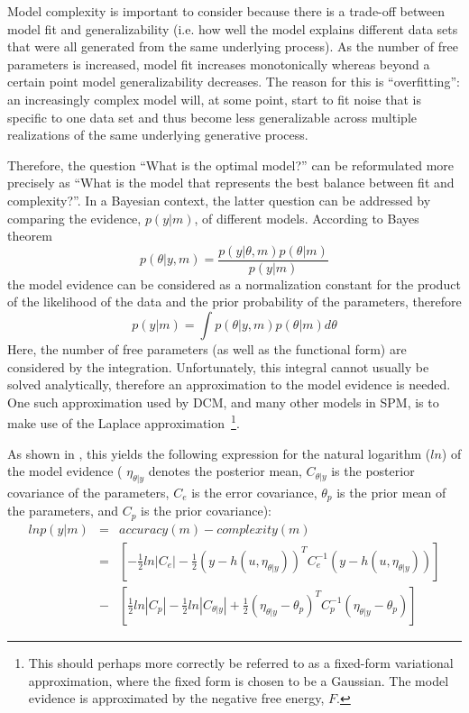Model complexity is important to consider because there is a trade-off between model fit and generalizability (i.e. how well the model explains different data sets that were all generated from the same underlying process).  As the number of free parameters is increased, model fit increases monotonically whereas beyond a certain point model generalizability decreases.  The reason for this is ``overfitting'':  an increasingly complex model will, at some point, start to fit noise that is specific to one data set and thus become less generalizable across multiple realizations of the same underlying generative process.

    Therefore, the question ``What is the optimal model?'' can be reformulated more precisely as ``What is the model that represents the best balance between fit and complexity?''. In a Bayesian context, the latter question can be addressed by comparing the evidence, $p(y|m)$, of different models. According to Bayes theorem
\begin{equation}
p(\theta|y,m) = \frac{p(y|\theta,m)p(\theta|m)}{p(y|m)}
\end{equation}
the model evidence can be considered as a normalization constant for the product of the likelihood of the data and the prior probability of the parameters, therefore
\begin{equation}
p(y|m) = \int p(\theta|y,m) p(\theta|m) d\theta
\end{equation}
Here, the number of free parameters (as well as the functional form) are considered by the integration.  Unfortunately, this integral cannot usually be solved analytically, therefore an approximation to the model evidence is needed. One such approximation used by DCM, and many other models in SPM, is to make use of the Laplace approximation~\footnote{This should perhaps more correctly be referred to as a fixed-form variational approximation, where the fixed form is chosen to be a Gaussian. The model evidence is approximated by the negative free energy, $F$.}.

As shown in \cite{cdcm}, this yields the following expression for the natural logarithm ($ln$) of the model evidence ( $\eta_{\theta | y}$ denotes the posterior mean, $C_{\theta | y}$ is the posterior covariance of the parameters, $C_e$  is the error covariance, $\theta_p$ is the prior mean of the parameters, and $C_p$ is the prior covariance):
\begin{eqnarray}
ln p(y|m) & = & accuracy(m) - complexity (m) \\ \nonumber
& = & \left[ -\frac{1}{2} ln |C_e| - \frac{1}{2} (y-h(u,\eta_{\theta | y}))^T C_e^{-1} (y-h(u,\eta_{\theta | y}))\right] \\ \nonumber
& - & \left[ \frac{1}{2} ln |C_p| -\frac{1}{2}ln |C_{\theta | y}| + \frac{1}{2} (\eta_{\theta | y}-\theta_p)^T C_p^{-1} (\eta_{\theta | y}-\theta_p) \right]
\end{eqnarray}

